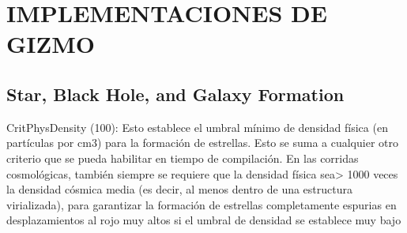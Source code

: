 \section{IMPLEMENTACIONES DE GIZMO}
\subsection{Star, Black Hole, and Galaxy Formation}

CritPhysDensity (100):  Esto establece el umbral mínimo de densidad física (en partículas por cm3) para la formación de estrellas. Esto se suma a cualquier otro criterio que se pueda habilitar en tiempo de compilación. En las corridas cosmológicas, también siempre se requiere que la densidad física sea> 1000 veces la densidad cósmica media (es decir, al menos dentro de una estructura virializada), para garantizar la formación de estrellas completamente espurias en desplazamientos al rojo muy altos si el umbral de densidad se establece muy bajo

